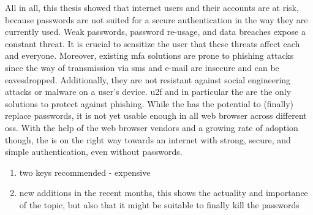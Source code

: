 All in all, this thesis showed that internet users and their accounts are at risk, because passwords are not suited for a secure authentication in the way they are currently used. Weak passwords, password re-usage, and data breaches expose a constant threat. It is crucial to sensitize the user that these threats affect each and everyone. Moreover, existing \gls{mfa} solutions are prone to phishing attacks since the way of transmission via \gls{sms} and e-mail are insecure and can be eavesdropped. Additionally, they are not resistant against social engineering attacks or malware on a user's device. \gls{u2f} and in particular the \wa{} are the only solutions to protect against phishing. While the \wa{} has the potential to (finally) replace passwords, it is not yet usable enough in all web browser across different \glspl{os}. With the help of the web browser vendors and a growing rate of adoption though, the \wa{} is on the right way towards an internet with strong, secure, and simple authentication, even without passwords.

\begin{enumerate}
	\item two keys recommended - expensive
	\item new additions in the recent months, this shows the actuality and importance of the topic, but also that it might be suitable to finally kill the passwords
\end{enumerate}